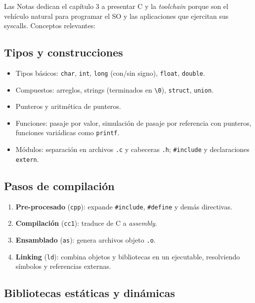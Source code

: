 \documentclass[11pt,a4paper]{article}
\begin{document}
Las Notas dedican el capítulo 3 a presentar C y la \emph{toolchain}
porque son el vehículo natural para programar el SO y las
aplicaciones que ejercitan sus syscalls. Conceptos relevantes:

\subsection{Tipos y construcciones}

\begin{itemize}[leftmargin=*]
    \item Tipos básicos: \texttt{char}, \texttt{int}, \texttt{long}
        (con/sin signo), \texttt{float}, \texttt{double}.
    \item Compuestos: arreglos, strings (terminados en \texttt{\textbackslash 0}),
        \texttt{struct}, \texttt{union}.
    \item Punteros y aritmética de punteros.
    \item Funciones: pasaje por valor, simulación de pasaje por
        referencia con punteros, funciones variádicas como
        \texttt{printf}.
    \item Módulos: separación en archivos \texttt{.c} y cabeceras
        \texttt{.h}; \texttt{\#include} y declaraciones \texttt{extern}.
\end{itemize}

\subsection{Pasos de compilación}

\begin{enumerate}[leftmargin=*]
    \item \textbf{Pre-procesado} (\texttt{cpp}): expande
        \texttt{\#include}, \texttt{\#define} y demás directivas.
    \item \textbf{Compilación} (\texttt{cc1}): traduce de C a
        \emph{assembly}.
    \item \textbf{Ensamblado} (\texttt{as}): genera archivos objeto
        \texttt{.o}.
    \item \textbf{Linking} (\texttt{ld}): combina objetos y bibliotecas
        en un ejecutable, resolviendo símbolos y referencias externas.
\end{enumerate}

\subsection{Bibliotecas estáticas y dinámicas}
\end{document}
